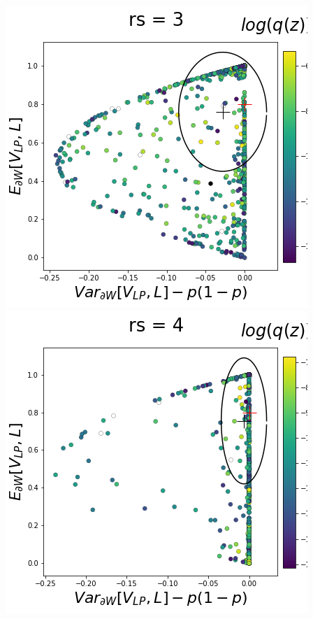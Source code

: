 \documentclass[11pt]{article}
\begin{document}
\begin{center}
\includegraphics[scale=0.33]{figs/T_x_SC_pvar_full_c=0_p=80_rs=3.png} \\
\includegraphics[scale=0.33]{figs/T_x_SC_pvar_full_c=0_p=80_rs=4.png}

\end{center}
\end{document}
